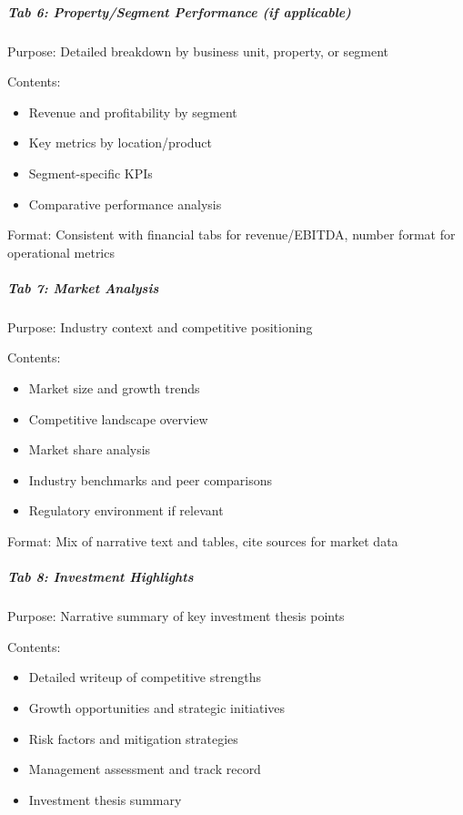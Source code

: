 \documentclass[11pt]{article}
\begin{document}
\subparagraph{Tab 6: Property/Segment Performance (if applicable)}\mbox{}\par
Purpose: Detailed breakdown by business unit, property, or segment


Contents:

\begin{itemize}[leftmargin=*,itemsep=2pt,topsep=2pt]
\item {} Revenue and profitability by segment
\item {} Key metrics by location/product
\item {} Segment-specific KPIs
\item {} Comparative performance analysis
\end{itemize}

Format: Consistent with financial tabs for revenue/EBITDA, number format for operational metrics


\subparagraph{Tab 7: Market Analysis}\mbox{}\par
Purpose: Industry context and competitive positioning


Contents:

\begin{itemize}[leftmargin=*,itemsep=2pt,topsep=2pt]
\item {} Market size and growth trends
\item {} Competitive landscape overview
\item {} Market share analysis
\item {} Industry benchmarks and peer comparisons
\item {} Regulatory environment if relevant
\end{itemize}

Format: Mix of narrative text and tables, cite sources for market data


\subparagraph{Tab 8: Investment Highlights}\mbox{}\par
Purpose: Narrative summary of key investment thesis points


Contents:

\begin{itemize}[leftmargin=*,itemsep=2pt,topsep=2pt]
\item {} Detailed writeup of competitive strengths
\item {} Growth opportunities and strategic initiatives
\item {} Risk factors and mitigation strategies
\item {} Management assessment and track record
\item {} Investment thesis summary
\end{itemize}
\end{document}

